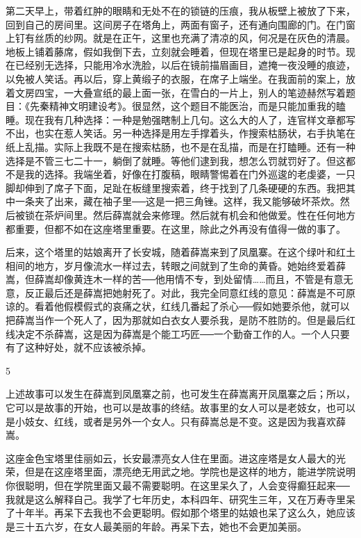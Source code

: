 第二天早上，带着红肿的眼睛和无处不在的锁链的压痕，我从板壁上被放了下来，回到自己的房间里。这间房子在塔角上，两面有窗子，还有通向围廊的门。在门窗上钉有丝质的纱网。就是在正午，这里也充满了清凉的风，何况是在灰色的清晨。地板上铺着藤席，假如我倒下去，立刻就会睡着，但现在塔里已是起身的时节。现在已经别无选择，只能用冷水洗脸，以后在镜前描眉画目，遮掩一夜没睡的痕迹，以免被人笑话。再以后，穿上黄缎子的衣服，在席子上端坐。在我面前的案上，放着文房四宝，一大叠宣纸的最上面一张，在雪白的一片上，别人的笔迹赫然写着题目：《先秦精神文明建设考》。很显然，这个题目不能医治，而是只能加重我的瞌睡。现在我有几种选择：一种是勉强瞎制上几句。这么大的人了，连官样文章都写不出，也实在惹人笑话。另一种选择是用左手撑着头，作搜索枯肠状，右手执笔在纸上乱描。实际上我既不是在搜索枯肠，也不是在乱描，而是在打瞌睡。还有一种选择是不管三七二十一，躺倒了就睡。等他们逮到我，想怎么罚就罚好了。但这都不是我的选择。我端坐着，好像在打腹稿，眼睛警惕着在门外巡逡的老虔婆，一只脚却伸到了席子下面，足趾在板缝里搜索着，终于找到了几条硬硬的东西。我把其中一条夹了出来，藏在袖子里──这是一把三角锉。这样，我又能够破坏茶炊。然后被锁在茶炉间里。然后薛嵩就会来修理。然后就有机会和他做爱。性在任何地方都重要，但都不如在这座塔里重要。在这里，除此之外再没有值得一做的事了。 

后来，这个塔里的姑娘离开了长安城，随着薛嵩来到了凤凰寨。在这个绿叶和红土相间的地方，岁月像流水一样过去，转眼之间就到了生命的黄昏。她始终爱着薛嵩，但薛嵩却像黄连木一样的苦──他用情不专，到处留情……而且，不管是有意无意，反正最后还是薛嵩把她射死了。对此，我完全同意红线的意见：薛嵩是不可原谅的。看着他假模假式的哀痛之状，红线几番起了杀心──假如她要杀他，就可以把薛嵩当作一个死人了，因为那就如白衣女人要杀我，是防不胜防的。但是最后红线决定不杀薛嵩，这是因为薛嵩是个能工巧匠──一个勤奋工作的人。一个人只要有了这种好处，就不应该被杀掉。 

5 

上述故事可以发生在薛嵩到凤凰寨之前，也可发生在薛嵩离开凤凰寨之后；所以，它可以是故事的开始，也可以是故事的终结。故事里的女人可以是老妓女，也可以是小妓女、红线，或者是另外一个女人。只有薛嵩总是不变。这是因为我喜欢薛嵩。 

这座金色宝塔里佳丽如云，长安最漂亮女人住在里面。进这座塔是女人最大的光荣，但是在这座塔里面，漂亮绝无用武之地。学院也是这样的地方，能进学院说明你很聪明，但在学院里面又最不需要聪明。在这里呆久了，人会变得癫狂起来──我就是这么解释自己。我学了七年历史，本科四年、研究生三年，又在万寿寺里呆了十年半。再呆下去我也不会更聪明。假如那个塔里的姑娘也呆了这么久，她应该是三十五六岁，在女人最美丽的年龄。再呆下去，她也不会更加美丽。 

